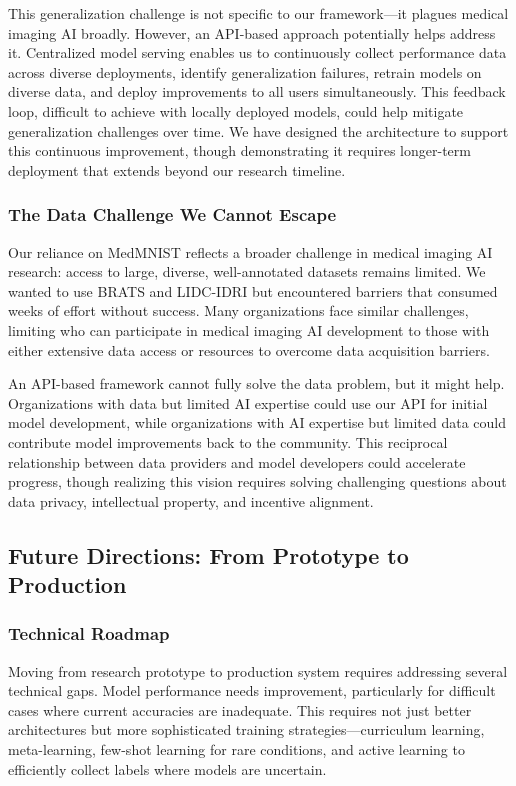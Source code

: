 \documentclass[12pt,a4paper]{article}
\begin{document}
This generalization challenge is not specific to our framework—it plagues medical imaging AI broadly. However, an API-based approach potentially helps address it. Centralized model serving enables us to continuously collect performance data across diverse deployments, identify generalization failures, retrain models on diverse data, and deploy improvements to all users simultaneously. This feedback loop, difficult to achieve with locally deployed models, could help mitigate generalization challenges over time. We have designed the architecture to support this continuous improvement, though demonstrating it requires longer-term deployment that extends beyond our research timeline.

\subsubsection{The Data Challenge We Cannot Escape}

Our reliance on MedMNIST reflects a broader challenge in medical imaging AI research: access to large, diverse, well-annotated datasets remains limited. We wanted to use BRATS and LIDC-IDRI but encountered barriers that consumed weeks of effort without success. Many organizations face similar challenges, limiting who can participate in medical imaging AI development to those with either extensive data access or resources to overcome data acquisition barriers.

An API-based framework cannot fully solve the data problem, but it might help. Organizations with data but limited AI expertise could use our API for initial model development, while organizations with AI expertise but limited data could contribute model improvements back to the community. This reciprocal relationship between data providers and model developers could accelerate progress, though realizing this vision requires solving challenging questions about data privacy, intellectual property, and incentive alignment.

\subsection{Future Directions: From Prototype to Production}

\subsubsection{Technical Roadmap}

Moving from research prototype to production system requires addressing several technical gaps. Model performance needs improvement, particularly for difficult cases where current accuracies are inadequate. This requires not just better architectures but more sophisticated training strategies—curriculum learning, meta-learning, few-shot learning for rare conditions, and active learning to efficiently collect labels where models are uncertain.
\end{document}
